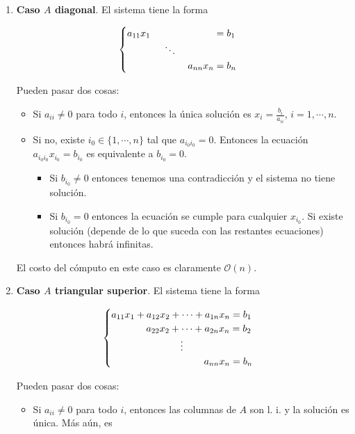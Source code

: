 \begin{enumerate}
\item \textbf{Caso $A$ diagonal}. El sistema tiene la forma

\[\begin{cases}
a_{11} x_1 \hspace{2.3cm} = b_1 \\
\hspace{1.35cm}\ddots \\ 
\hspace{2.2cm} a_{nn} x_n = b_n 
\end{cases}\]

Pueden pasar dos cosas:

\begin{itemize}
\item Si $a_{ii} \neq 0$ para todo $i$, entonces la única solución es $x_i = \frac{b_i}{a_{ii}}$, $i = 1, \cdots, n$.
\item Si no, existe $i_0 \in \{1, \cdots, n\}$ tal que $a_{i_0i_0} = 0$. Entonces la ecuación $a_{i_0i_0} x_{i_0} = b_{i_0}$ es equivalente a $b_{i_0} = 0$.
\begin{itemize}
\item Si $b_{i_0} \neq 0$ entonces tenemos una contradicción y el sistema no tiene solución.
\item Si $b_{i_0} = 0$ entonces la ecuación se cumple para cualquier $x_{i_0}$. Si existe solución (depende de lo que suceda con las restantes ecuaciones) entonces habrá infinitas.
\end{itemize}
\end{itemize}

El costo del cómputo en este caso es claramente $\mathcal{O}(n)$.

\item \textbf{Caso $A$ triangular superior}. El sistema tiene la forma

\[\begin{cases}
a_{11} x_1 + a_{12} x_2 + \cdots + a_{1n} x_n = b_1 \\
\hspace{1.26cm} a_{22} x_2 + \cdots + a_{2n} x_n = b_2 \\
\hspace{2.5cm}\vdots \\ 
\hspace{3.35cm} a_{nn} x_n = b_n
\end{cases}\]

Pueden pasar dos cosas:

\begin{itemize}
\item Si $a_{ii} \neq 0$ para todo $i$, entonces las columnas de $A$ son l. i. y la solución es única. Más aún, es


\end{itemize}
\end{enumerate}

